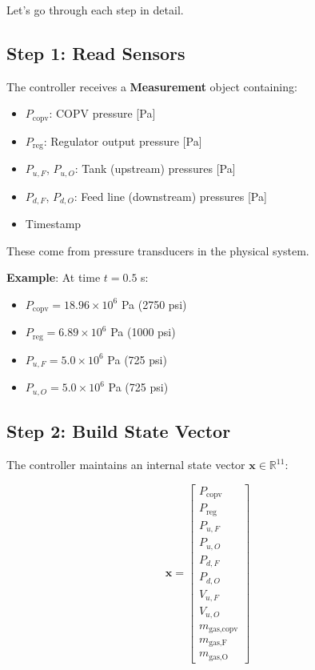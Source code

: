 \documentclass[11pt,a4paper]{article}
\begin{document}
Let's go through each step in detail.

\subsection{Step 1: Read Sensors}

The controller receives a \textbf{Measurement} object containing:
\begin{itemize}
    \item $P_{\text{copv}}$: COPV pressure [Pa]
    \item $P_{\text{reg}}$: Regulator output pressure [Pa]
    \item $P_{u,F}$, $P_{u,O}$: Tank (upstream) pressures [Pa]
    \item $P_{d,F}$, $P_{d,O}$: Feed line (downstream) pressures [Pa]
    \item Timestamp
\end{itemize}

These come from pressure transducers in the physical system.

\textbf{Example}: At time $t = 0.5$ s:
\begin{itemize}
    \item $P_{\text{copv}} = 18.96 \times 10^6$ Pa (2750 psi)
    \item $P_{\text{reg}} = 6.89 \times 10^6$ Pa (1000 psi)
    \item $P_{u,F} = 5.0 \times 10^6$ Pa (725 psi)
    \item $P_{u,O} = 5.0 \times 10^6$ Pa (725 psi)
\end{itemize}

\subsection{Step 2: Build State Vector}

The controller maintains an internal state vector $\mathbf{x} \in \mathbb{R}^{11}$:

\begin{equation}
\mathbf{x} = \begin{bmatrix}
P_{\text{copv}} \\
P_{\text{reg}} \\
P_{u,F} \\
P_{u,O} \\
P_{d,F} \\
P_{d,O} \\
V_{u,F} \\
V_{u,O} \\
m_{\text{gas,copv}} \\
m_{\text{gas,F}} \\
m_{\text{gas,O}}
\end{bmatrix}
\end{equation}
\end{document}
